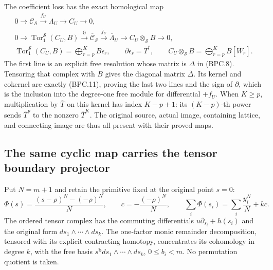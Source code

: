The coefficient loss has the exact homological map
\[
\begin{gathered}
0\longrightarrow\mathcal C_{\mathscr S}\xrightarrow{f_U}\Lambda_U
          \longrightarrow C_U\longrightarrow0,\\
0\longrightarrow\operatorname{Tor}_1^{\mathscr S}(C_U,B)
 \xrightarrow{\partial}\overline{\mathcal C}_{\mathscr S}
 \xrightarrow{\overline f_U}\overline\Lambda_U
 \longrightarrow C_U\otimes_{\mathscr S}B\longrightarrow0,\\
\operatorname{Tor}_1^{\mathscr S}(C_U,B)=\bigoplus_{r=p}^K B\epsilon_r,
\qquad \partial\epsilon_r=\overline T^r,
\qquad C_U\otimes_{\mathscr S}B=\bigoplus_{r=p}^K B[\overline W_r].
\end{gathered}
\tag{BPC.14}\label{eq:bpc14}
\]
The first line is an explicit free resolution whose matrix is
\(\Delta\) in (BPC.8).  Tensoring that complex with \(B\)
gives the diagonal matrix \(\overline\Delta\).  Its kernel
and cokernel are exactly (BPC.11), proving the last two lines
and the sign of \(\partial\), which is the inclusion into
the degree-one free module for differential \(+f_U\).
When \(K\geq p\), multiplication by \(\overline T\) on
this kernel has index \(K-p+1\): its \((K-p)\)-th power
sends \(\overline T^p\) to the nonzero \(\overline T^K\).
The original source, actual image, containing lattice, and
connecting image are thus all present with their proved maps.

\subsection{The same cyclic map carries the tensor boundary projector}
\label{sec:btp-tensor-boundary-update}

Put \(N=m+1\) and retain the primitive fixed at the original
point \(s=0\):
\[
 \Phi(s)=\frac{(s-\rho)^N-(-\rho)^N}{N},\qquad
 c=-\frac{(-\rho)^N}{N},\qquad
 \sum_i\Phi(s_i)=\sum_i\frac{y_i^N}{N}+kc.
\tag{BTP.1}\label{eq:btp1}
\]
The ordered tensor complex has the commuting differentials
\(u\partial_{s_i}+h(s_i)\) and the original form
\(ds_1\wedge\cdots\wedge ds_k\).  The one-factor monic
remainder decomposition, tensored with its explicit contracting
homotopy, concentrates its cohomology in degree \(k\), with
the free basis \(s^{\mathbf b}ds_1\wedge\cdots\wedge ds_k\),
\(0\leq b_i<m\).  No permutation quotient is taken.

